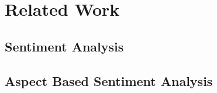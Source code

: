 \chapter{Related Work}
\label{ch:relWork}

\section{Sentiment Analysis}

\section{Aspect Based Sentiment Analysis}